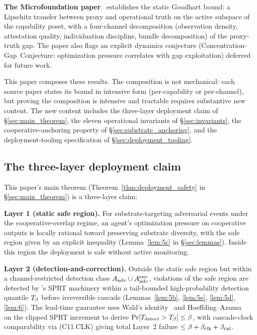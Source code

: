 \textbf{The Microfoundation paper}~\citep{lasser2026micro} establishes the
static Goodhart bound: a Lipschitz transfer between proxy and operational truth
on the active subspace of the capability poset, with a four-channel
decomposition (observation density, attestation quality, individuation
discipline, bundle decomposition) of the proxy-truth gap. The paper also flags
an explicit dynamics conjecture (Concentration-Gap~Conjecture: optimization
pressure correlates with gap exploitation) deferred for future work.

This paper composes these results. The composition is not mechanical: each
source paper states its bound in intensive form (per-capability or
per-channel), but proving the composition is intensive and tractable requires
substantive new content. The new content includes the three-layer deployment
claim of \S\ref{sec:main_theorem}, the eleven operational invariants of
\S\ref{sec:invariants}, the cooperative-anchoring property of
\S\ref{sec:substrate_anchoring}, and the deployment-tooling specification of
\S\ref{sec:deployment_tooling}.

\subsection{The three-layer deployment claim}
\label{sec:claim_preview}

This paper's main theorem (Theorem~\ref{thm:deployment_safety} in
\S\ref{sec:main_theorem}) is a three-layer claim:

\textbf{Layer 1 (static safe region).} For substrate-targeting adversarial
events under the cooperative-overlap regime, an agent's optimization pressure
on cooperative outputs is locally rational toward preserving substrate
diversity, with the safe region given by an explicit inequality
(Lemma~\ref{lem:5c} in \S\ref{sec:lemmas}). Inside this region the deployment
is safe without active monitoring.

\textbf{Layer 2 (detection-and-correction).} Outside the static safe region but
within a channel-restricted detection class $A_{\mathrm{adv}} \cup A_{\mathrm{adv}}^{\mathrm{env}}$,
violations of the safe region are detected by
\citep[Exogenous~Verification]{lasser2026exo}'s SPRT machinery within a
tail-bounded high-probability detection quantile $T_{\beta}$ before irreversible
cascade (Lemmas~\ref{lem:5b}, \ref{lem:5e}, \ref{lem:5d}, \ref{lem:6}).  The
lead-time guarantee uses Wald's identity~\citep{wald1947sequential} and
Hoeffding--Azuma~\citep{hoeffding1963probability,azuma1967weighted} on the
clipped SPRT increment to derive $\Pr[T_{\mathrm{detect}} > T_{\beta}] \leq
\beta$, with cascade-clock comparability via (C11.CLK) giving total Layer~2
failure $\leq \beta + \beta_{\mathrm{clk}} + \beta_{\mathrm{cal}}$.

